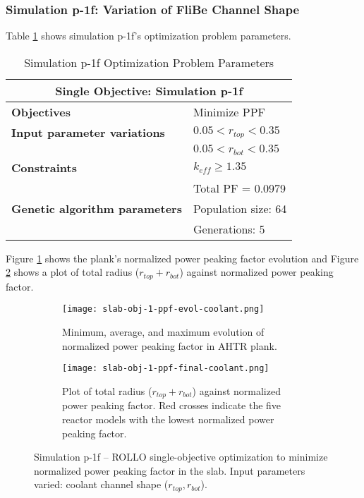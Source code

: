 \subsubsection{Simulation p-1f: Variation of FliBe Channel Shape}
Table \ref{tab:simulationp1f} shows simulation p-1f's optimization problem parameters. 
\begin{table}[htbp!]
    \centering
    \onehalfspacing
    \caption{Simulation p-1f Optimization Problem Parameters}
	\label{tab:simulationp1f}
    \footnotesize
    \begin{tabular}{l|p{3cm}}
    \hline 
    \multicolumn{2}{c}{\textbf{Single Objective: Simulation p-1f}} \\
    \hline 
    \textbf{Objectives} & Minimize PPF \\
    \hline 
    \textbf{Input parameter variations} & $0.05<r_{top}<0.35$ \\
    & $0.05<r_{bot}<0.35$ \\
    \hline
    \textbf{Constraints} & $k_{eff} \geq 1.35$\\ 
    & Total PF = 0.0979\\
    \hline 
    \textbf{Genetic algorithm parameters} & Population size: 64 \\
    & Generations: 5 \\
    \hline
    \end{tabular}
\end{table}

Figure \ref{fig:slab-obj-1-ppf-evol-coolant} shows the plank's normalized power peaking 
factor evolution and Figure \ref{fig:slab-obj-1-ppf-final-coolant} shows a plot of total 
radius ($r_{top} + r_{bot}$) against normalized power peaking factor. 
\begin{figure}[htbp!]
    \centering
    \begin{subfigure}{\textwidth}
        \texttt{[image: slab-obj-1-ppf-evol-coolant.png]}
        \caption{Minimum, average, and maximum evolution of normalized power 
        peaking factor in AHTR plank.}
        \label{fig:slab-obj-1-ppf-evol-coolant} 
    \end{subfigure}
    \begin{subfigure}{\textwidth}
        \texttt{[image: slab-obj-1-ppf-final-coolant.png]}
        \caption{Plot of total radius ($r_{top} + r_{bot}$) against normalized 
        power peaking factor. Red crosses indicate the five reactor models with the 
        lowest normalized power peaking factor.}
        \label{fig:slab-obj-1-ppf-final-coolant} 
    \end{subfigure}
    \caption{Simulation p-1f -- ROLLO single-objective optimization to minimize normalized power 
    peaking factor in the slab. Input parameters varied: coolant channel shape 
    ($r_{top}, r_{bot}$).}
    \label{fig:slab-obj-1-ppf-coolant}
\end{figure}

